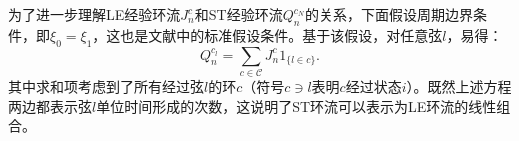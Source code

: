 为了进一步理解LE经验环流$J_n^c$和ST经验环流$Q_n^{c_N}$的关系，下面假设周期边界条件，即$\xi_0 = \xi_1$，这也是文献\cite{den2000large}中的标准假设条件。基于该假设，对任意弦$l$，易得：
\begin{equation}\label{conversion}
    Q_n^{c_l} = \sum_{c\in\mathcal{C}}J^c_n1_{\{l\in c\}}.
\end{equation}
其中求和项考虑到了所有经过弦$l$的环$c$（符号$c \ni l$表明$c$经过状态$i$）。既然上述方程两边都表示弦$l$单位时间形成的次数，这说明了ST环流可以表示为LE环流的线性组合。
